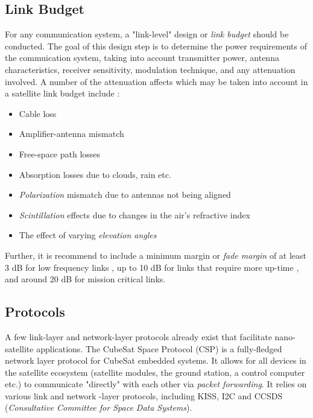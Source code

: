 \subsection{Link Budget}\label{sec:link_budget}
For any communication system, a "link-level" design or \textit{link budget} should be conducted. The goal of this design step is to determine the power requirements of the commuication system, taking into account transmitter power, antenna characteristics, receiver sensitivity, modulation technique, and any attenuation involved. A number of the attenuation affects which may be taken into account in a satellite link budget include \cite{design-satelliteLinkBudget}:
\begin{itemize}
    \item Cable loss
    \item Amplifier-antenna mismatch
    \item Free-space path losses
    \item Absorption losses due to clouds, rain etc.
    \item \textit{Polarization} mismatch due to antennas not being aligned
    \item \textit{Scintillation} effects due to changes in the air's refractive index
    \item The effect of varying \textit{elevation angles}
\end{itemize}

\noindent Further, it is recommend to include a minimum margin or \textit{fade margin} of at least 3 dB for low frequency links \cite{paper-linkMargin}, up to 10 dB for links that require more up-time \cite{design-linkBudgetDesign}, and around 20 dB for mission critical links.

\subsection{Protocols}
A few link-layer and network-layer protocols already exist that facilitate nano-satellite applications. 
The CubeSat Space Protocol (CSP) \cite{standard-csp} is a fully-fledged network layer protocol for CubeSat embedded systems. It allows for all devices in the satellite ecosystem (satellite modules, the ground station, a control computer etc.) to communicate "directly" with each other via \textit{packet forwarding}. It relies on various link and network -layer protocols, including KISS, I2C and CCSDS (\textit{Consultative Committee for Space Data Systems}).